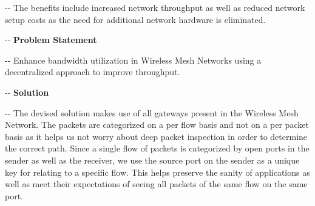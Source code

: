 \documentclass[12pt]{article}
\makeatletter
\newenvironment{indentation}[3]%
	{\par\setlength{\parindent}{#3}
	\setlength{\leftmargin}{#1}       \setlength{\rightmargin}{#1}%
	\advance\linewidth -\leftmargin       \advance\linewidth -\rightmargin%
	\advance\@totalleftmargin\leftmargin  \@setpar{{\@@par}}%
	\parshape 1\@totalleftmargin \linewidth\ignorespaces}{\par}%
\makeatother
\begin{document}
\begin{indentation}{0pt}{0pt}{0pt}
{\normalsize \hspace{1cm}The benefits include increased network throughput as well as reduced network setup costs as the need for additional network hardware is eliminated.}
\end{indentation}

\begin{indentation}{0pt}{0pt}{0pt}
\vspace{1cm}
\textbf{{{\Large Problem Statement}}}
\end{indentation}
\vspace{0.5cm}

\begin{indentation}{0pt}{0pt}{0pt}
{\normalsize \hspace{1cm} Enhance bandwidth utilization in Wireless Mesh Networks using a decentralized approach to improve throughput.}
\end{indentation}

\begin{indentation}{0pt}{0pt}{0pt}
  \vspace{1cm}
 \pagebreak
\textbf{{{\Large Solution}}}
\end{indentation}
\vspace{0.5cm}
\begin{indentation}{0pt}{0pt}{0pt}
{\normalsize \hspace{1cm} The devised solution makes use of all gateways present in the Wireless Mesh Network. The packets are categorized on a per flow basis and not on a per packet basis as it helps us not worry about deep packet inspection in order to determine the correct path. Since a single flow of packets is categorized by open ports in the sender as well as the receiver, we use the source port on the sender as a unique key for relating to a specific flow. This helps preserve the sanity of applications as well as meet their expectations of seeing all packets of the same flow on the same port.}
\end{indentation}
\end{document}
